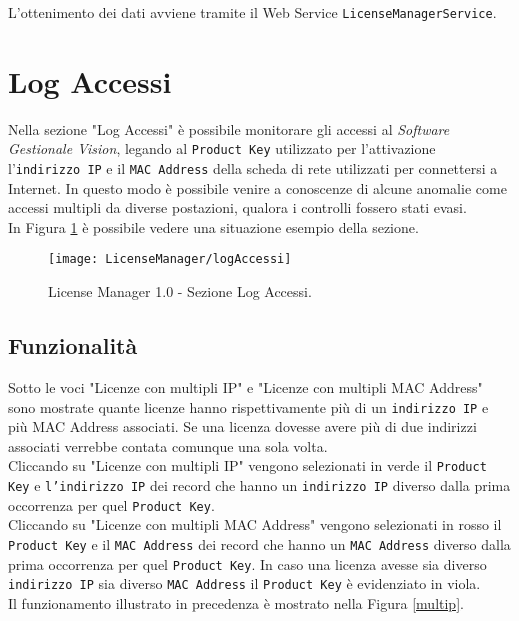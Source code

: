 L'ottenimento dei dati avviene tramite il Web Service \texttt{LicenseManagerService}.

\section{Log Accessi}

Nella sezione "Log Accessi" è possibile monitorare gli accessi al \textit{Software Gestionale Vision}, legando al \texttt{Product Key} utilizzato per l’attivazione l’\texttt{indirizzo IP} e il \texttt{MAC Address} della scheda di rete utilizzati per connettersi a Internet. In questo modo è possibile venire a conoscenze di alcune anomalie come accessi multipli da diverse postazioni, qualora i controlli fossero stati evasi.\\
In Figura \ref{accessi} è possibile vedere una situazione esempio della sezione.
\begin{figure}[!h] 
    \centering 
    \texttt{[image: LicenseManager/logAccessi]} 
    \caption{License Manager 1.0 - Sezione Log Accessi.}
\label{accessi}

\end{figure}

\subsection{Funzionalità}

Sotto le voci "Licenze con multipli IP" e "Licenze con multipli MAC Address" sono mostrate quante licenze hanno rispettivamente più di un \texttt{indirizzo IP} e più {MAC Address} associati.
Se una licenza dovesse avere più di due indirizzi associati verrebbe contata comunque una sola volta.\\
Cliccando su "Licenze con multipli IP" vengono selezionati in verde il \texttt{Product Key} e \texttt{l’indirizzo IP} dei record che hanno un \texttt{indirizzo IP} diverso dalla prima occorrenza per quel \texttt{Product Key}.\\
Cliccando su "Licenze con multipli MAC Address" vengono selezionati in rosso il \texttt{Product Key} e il \texttt{MAC Address} dei record che hanno un \texttt{MAC Address} diverso dalla prima occorrenza per quel \texttt{Product Key}.
In caso una licenza avesse sia diverso \texttt{indirizzo IP} sia diverso \texttt{MAC Address} il \texttt{Product Key} è evidenziato in viola.\\
Il funzionamento illustrato in precedenza è mostrato nella Figura \ref{multip}.

